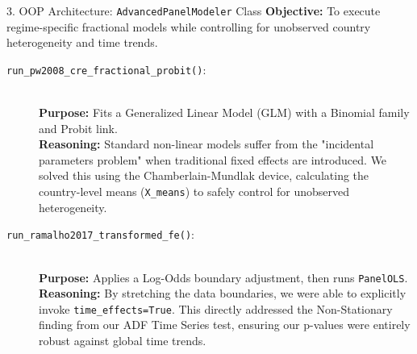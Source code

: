 \documentclass[aspectratio=169]{beamer}
\begin{document}
\begin{frame}{3. OOP Architecture: \texttt{AdvancedPanelModeler} Class}
  \footnotesize 
  \textbf{Objective:} To execute regime-specific fractional models while controlling for unobserved country heterogeneity and time trends.
  \vspace{0.1cm}

  \begin{description}
      \item[\texttt{run\_pw2008\_cre\_fractional\_probit()}:] \hfill \\
      \textbf{Purpose:} Fits a Generalized Linear Model (GLM) with a Binomial family and Probit link. \\
      \textbf{Reasoning:} Standard non-linear models suffer from the "incidental parameters problem" when traditional fixed effects are introduced. We solved this using the Chamberlain-Mundlak device, calculating the country-level means (\texttt{X\_means}) to safely control for unobserved heterogeneity.

      \item[\texttt{run\_ramalho2017\_transformed\_fe()}:] \hfill \\
      \textbf{Purpose:} Applies a Log-Odds boundary adjustment, then runs \texttt{PanelOLS}. \\
      \textbf{Reasoning:} By stretching the data boundaries, we were able to explicitly invoke \texttt{time\_effects=True}. This directly addressed the Non-Stationary finding from our ADF Time Series test, ensuring our p-values were entirely robust against global time trends.
  \end{description}
\end{frame}
\end{document}
